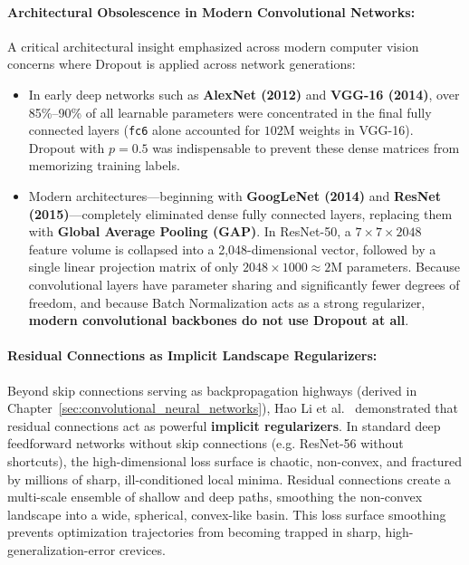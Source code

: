 \paragraph{Architectural Obsolescence in Modern Convolutional Networks:}
A critical architectural insight emphasized across modern computer vision concerns where Dropout is applied across network generations:
\begin{itemize}[noitemsep,topsep=2pt,parsep=0pt,partopsep=0pt]
  \item In early deep networks such as \textbf{AlexNet (2012)} and \textbf{VGG-16 (2014)}, over 85\%--90\% of all learnable parameters were concentrated in the final fully connected layers (\texttt{fc6} alone accounted for $102\text{M}$ weights in VGG-16). Dropout with $p=0.5$ was indispensable to prevent these dense matrices from memorizing training labels.
  \item Modern architectures---beginning with \textbf{GoogLeNet (2014)} and \textbf{ResNet (2015)}---completely eliminated dense fully connected layers, replacing them with \textbf{Global Average Pooling (GAP)}. In ResNet-50, a $7 \times 7 \times 2048$ feature volume is collapsed into a 2,048-dimensional vector, followed by a single linear projection matrix of only $2048 \times 1000 \approx 2\text{M}$ parameters. Because convolutional layers have parameter sharing and significantly fewer degrees of freedom, and because Batch Normalization acts as a strong regularizer, \textbf{modern convolutional backbones do not use Dropout at all}.
\end{itemize}

\paragraph{Residual Connections as Implicit Landscape Regularizers:}
Beyond skip connections serving as backpropagation highways (derived in Chapter~\ref{sec:convolutional_neural_networks}), Hao Li et al.~\cite{li2018visualizing} demonstrated that residual connections act as powerful \textbf{implicit regularizers}. 
In standard deep feedforward networks without skip connections (e.g. ResNet-56 without shortcuts), the high-dimensional loss surface is chaotic, non-convex, and fractured by millions of sharp, ill-conditioned local minima. Residual connections create a multi-scale ensemble of shallow and deep paths, smoothing the non-convex landscape into a wide, spherical, convex-like basin. This loss surface smoothing prevents optimization trajectories from becoming trapped in sharp, high-generalization-error crevices.

